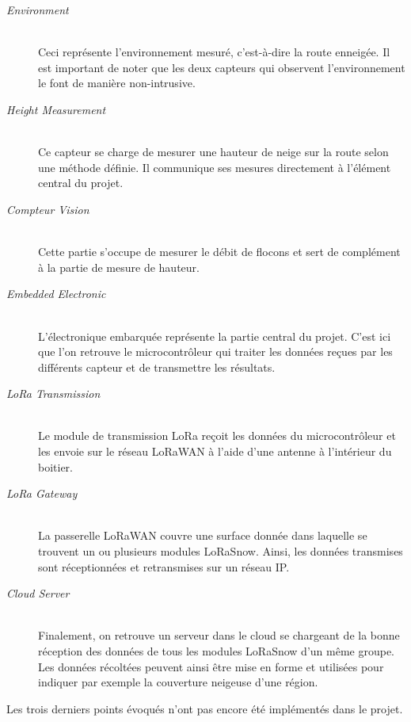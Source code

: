 \begin{description}
    \item[\emph{Environment}] \hfill \\ 
    Ceci représente l'environnement mesuré, c'est-à-dire la route enneigée. Il est important de noter
    que les deux capteurs qui observent l'environnement le font de manière non-intrusive.
    \item[\emph{Height Measurement}] \hfill \\
    Ce capteur se charge de mesurer une hauteur de neige sur la route selon une méthode définie. Il 
    communique ses mesures directement à l'élément central du projet. 
    \item[\emph{Compteur Vision}] \hfill \\
    Cette partie s'occupe de mesurer le débit de flocons et sert de complément à la partie de mesure 
    de hauteur. 
    \item[\emph{Embedded Electronic}] \hfill \\
    L'électronique embarquée représente la partie central du projet. C'est ici que l'on retrouve le
    microcontrôleur qui traiter les données reçues par les différents capteur et de transmettre les
    résultats. 
    \item[\emph{LoRa Transmission}] \hfill \\
     Le module de transmission LoRa reçoit les données du microcontrôleur et les envoie sur le réseau 
     LoRaWAN à l'aide d'une antenne à l'intérieur du boitier.
    \item[\emph{LoRa Gateway}] \hfill \\
    La passerelle LoRaWAN couvre une surface donnée dans laquelle se trouvent un ou plusieurs modules 
    LoRaSnow. Ainsi, les données transmises sont réceptionnées et retransmises sur un réseau IP. 
    \item[\emph{Cloud Server}] \hfill \\   
    Finalement, on retrouve un serveur dans le cloud se chargeant de la bonne réception des données 
    de tous les modules LoRaSnow d'un même groupe. Les données récoltées peuvent ainsi être mise en
    forme et utilisées pour indiquer par exemple la couverture neigeuse d'une région.
\end{description}

Les trois derniers points évoqués n'ont pas encore été implémentés dans le projet.